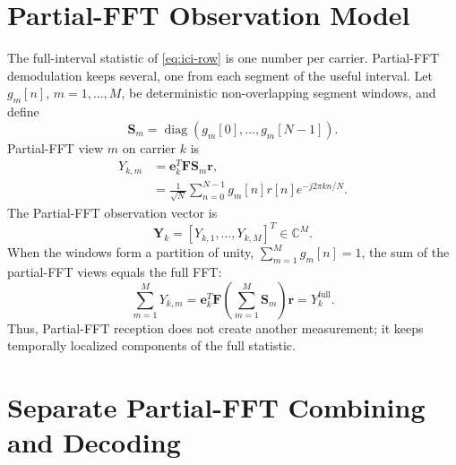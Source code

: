 \documentclass[conference]{IEEEtran}
\newcommand{\C}{\mathbb{C}}
\begin{document}
\section{Partial-FFT Observation Model}

The full-interval statistic of \eqref{eq:ici-row} is one number per carrier.
Partial-FFT demodulation keeps several, one from each segment of the useful
interval.
Let \(g_m[n]\), \(m=1,\ldots,M\), be deterministic non-overlapping segment
windows, and define
\begin{equation}
  \mathbf S_m
  =
  \operatorname{diag}\!\left(g_m[0],\ldots,g_m[N-1]\right).
  \label{eq:segment}
\end{equation}
Partial-FFT view \(m\) on carrier \(k\) is
\begin{align}
  Y_{k,m}
  &=
  \mathbf e_k^{T}\mathbf F\mathbf S_m\mathbf r,
  \label{eq:branch-operator}\\
  &=
  \frac{1}{\sqrt N}\sum_{n=0}^{N-1}
  g_m[n]r[n]e^{-j2\pi kn/N}.
  \label{eq:branch-sum}
\end{align}
The Partial-FFT observation vector is
\begin{equation}
  \mathbf Y_k
  =
  [Y_{k,1},\ldots,Y_{k,M}]^T\in\C^M .
  \label{eq:observation-vector}
\end{equation}
When the windows form a partition of unity,
\(\sum_{m=1}^{M}g_m[n]=1\), the sum of the partial-FFT views equals the full FFT:
\begin{equation}
  \sum_{m=1}^{M}Y_{k,m}
  =
  \mathbf e_k^T\mathbf F
  \left(\sum_{m=1}^{M}\mathbf S_m\right)\mathbf r
  =
  Y_k^{\mathrm{full}}.
  \label{eq:branch-identity}
\end{equation}
Thus, Partial-FFT reception does not create another measurement; it keeps
temporally localized components of the full statistic.

\section{Separate Partial-FFT Combining and Decoding}
\end{document}

